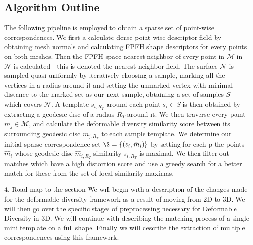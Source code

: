 \documentclass[10pt,twocolumn,letterpaper]{article}
\begin{document}
\subsection{Algorithm Outline}
The following pipeline is employed to obtain a sparse set of point-wise correspondences. 
We first a calculate dense point-wise descriptor field by obtaining mesh normals and calculating FPFH shape descriptors for every points on both meshes.
Then the FPFH space nearest neighbor of every point in $\mathcal{M}$ in $\mathcal{N}$ is calculated - this is denoted the nearest neighbor field.
The surface $\mathcal{N}$ is sampled quasi uniformly by iteratively choosing a sample, marking all the vertices in a radius around it and setting the unmarked vertex with minimal distance to the marked set as our next sample, obtaining a set of samples $S$ which covers $\mathcal{N}$.
A template $s_{i,R_T}$ around each point $s_i\in S$ is then obtained by extracting a geodesic disc of a radius $R_T$ around it.
We then traverse every point $m_j \in \mathcal{M}$, and calculate the deformable diversity similarity score between its surrounding geodesic disc $m_{j,R_T}$ to each sample template.
We determine our initial sparse correspondence set $\S = \{(s_i,\hat{m}_i)\}$  by setting for each p the points $\hat{m}_i$ whose geodesic disc $\hat{m}_{i,R_T}$ similarity $s_{i,R_T}$ is maximal.  
We then filter out matches which have a high distortion score and use a greedy search for a better match for these from the set of local similarity maximas. 

{\color{red}
	4. Road-map to the section
}
We will begin with a description of the changes made for the deformable diversity framework as a result of moving from 2D to 3D. We will then go over the specific stages of preprocessing necessary for Deformable Diversity in 3D. We will continue with describing the matching process of a single mini template on a full shape. Finally we will describe the extraction of multiple correspondences using this framework.

\end{document}
